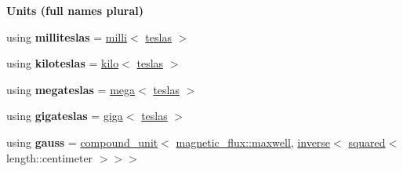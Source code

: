 \begin{Indent}{\bf Units (full names plural)}
\begin{DoxyCompactItemize}
\item 
\hypertarget{namespaceunits_1_1magnetic__field__strength_aebe993ab45892fff7eb0c80ed7248795}{}using {\bfseries milliteslas} = \hyperlink{group___unit_manipulators_gaec9d1c320e180eb59f3cb3094d8079dd}{milli}$<$ \hyperlink{structunits_1_1unit}{teslas} $>$\label{namespaceunits_1_1magnetic__field__strength_aebe993ab45892fff7eb0c80ed7248795}

\item 
\hypertarget{namespaceunits_1_1magnetic__field__strength_a555fdeb2a84f3583931faffe7355af3a}{}using {\bfseries kiloteslas} = \hyperlink{group___unit_manipulators_ga89965a45aaa6689548b9c53858759c5e}{kilo}$<$ \hyperlink{structunits_1_1unit}{teslas} $>$\label{namespaceunits_1_1magnetic__field__strength_a555fdeb2a84f3583931faffe7355af3a}

\item 
\hypertarget{namespaceunits_1_1magnetic__field__strength_a67dcca333f3a5edfd42ae8dff1b5db40}{}using {\bfseries megateslas} = \hyperlink{group___unit_manipulators_gab1e685fcf4dd9478ed3d688f7af50842}{mega}$<$ \hyperlink{structunits_1_1unit}{teslas} $>$\label{namespaceunits_1_1magnetic__field__strength_a67dcca333f3a5edfd42ae8dff1b5db40}

\item 
\hypertarget{namespaceunits_1_1magnetic__field__strength_ae84718c56f0087bbade174eaf7d65aac}{}using {\bfseries gigateslas} = \hyperlink{group___unit_manipulators_ga4595911f659ef61133216da15d61eb07}{giga}$<$ \hyperlink{structunits_1_1unit}{teslas} $>$\label{namespaceunits_1_1magnetic__field__strength_ae84718c56f0087bbade174eaf7d65aac}

\item 
\hypertarget{namespaceunits_1_1magnetic__field__strength_afbab51cc762b18bb20c3c4a04f1ecbe3}{}using {\bfseries gauss} = \hyperlink{group___unit_types_ga9c3f6f077dc894620e1ed8358442a8f1}{compound\+\_\+unit}$<$ \hyperlink{structunits_1_1unit}{magnetic\+\_\+flux\+::maxwell}, \hyperlink{group___unit_manipulators_gaacc539ef162e24b260d023d3ff949b57}{inverse}$<$ \hyperlink{group___unit_manipulators_ga636346f7898c35eb98a796bec1d77fb2}{squared}$<$ length\+::centimeter $>$$>$$>$\label{namespaceunits_1_1magnetic__field__strength_afbab51cc762b18bb20c3c4a04f1ecbe3}

\end{DoxyCompactItemize}
\end{Indent}
